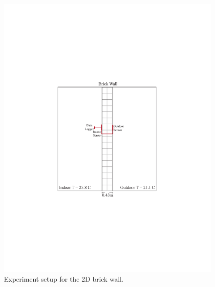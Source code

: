 \begin{figure}[tbh]
  \centering
  \includegraphics[trim=5.6cm 7.5cm 5.3cm 8cm, clip, width=.6\linewidth]{Figures/2dsection2.pdf}
\caption[2D Section and Setup]{Experiment setup for the 2D brick wall.}
\label{fig:2d2}
\end{figure}






